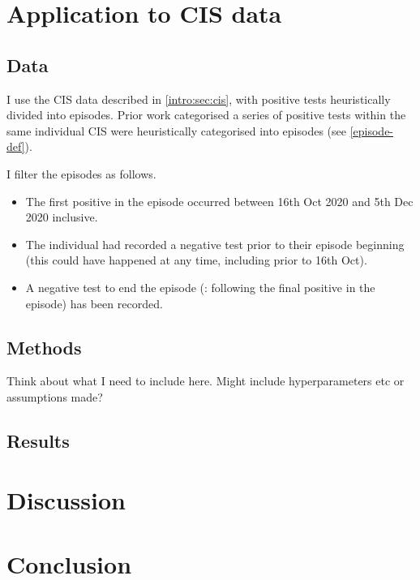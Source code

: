 \documentclass[thesis.tex]{subfiles}
\begin{document}
\section{Application to CIS data} \label{imperf-test:sec:application}

\subsection{Data}

I use the CIS data described in \cref{intro:sec:cis}, with positive tests heuristically divided into episodes.
Prior work categorised a series of positive tests within the same individual CIS were heuristically categorised into episodes (see \cref{episode-def}).

I filter the episodes as follows.
\begin{itemize}
\item
  The first positive in the episode occurred between 16th Oct 2020 and
  5th Dec 2020 inclusive.
\item
  The individual had recorded a negative test prior to their episode
  beginning (this could have happened at any time, including prior to
  16th Oct).
\item
  A negative test to end the episode (\ie: following the final positive in the episode) has been recorded.
\end{itemize}


\subsection{Methods}

Think about what I need to include here.
Might include hyperparameters etc or assumptions made?

\subsection{Results}

\section{Discussion} \label{imperf-test:sec:discussion}

\section{Conclusion} \label{imperf-test:sec:conclusion}
\end{document}
